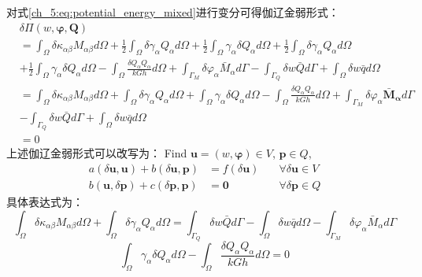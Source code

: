 对式\eqref{ch_5:eq:potential_energy_mixed}进行变分可得伽辽金弱形式：
\begin{equation} 
    \begin{split}
    &\delta\Pi(w,\boldsymbol\varphi,\boldsymbol{Q})\\
    &=\int_{\Omega}\delta\kappa_{\alpha \beta}M_{\alpha \beta}d\Omega+\frac{1}{2}\int_{\Omega}\delta\gamma_{\alpha}Q_{\alpha}d\Omega+\frac{1}{2}\int_{\Omega}\gamma_{\alpha}\delta{Q}_{\alpha}d\Omega+\frac{1}{2}\int_{\Omega}\delta\gamma_{\alpha}Q_{\alpha}d\Omega\\
    &+\frac{1}{2}\int_{\Omega}\gamma_{\alpha}\delta{Q}_{\alpha}d\Omega-\int_{\Omega}\frac{\delta{Q}_{\alpha}{Q}_{\alpha}}{kGh}d\Omega+\int_{\Gamma_{M}}\delta\varphi_{\alpha}{{\bar M}_{\alpha}}d\Gamma-\int_{\Gamma_{Q}}\delta{w}{\bar Q}d\Gamma+\int_{\Omega} \delta{w}\bar{q}d\Omega\\
    &=\int_{\Omega}\delta\kappa_{\alpha \beta}M_{\alpha \beta}d\Omega+\int_{\Omega}\delta\gamma_{\alpha}Q_{\alpha}d\Omega+\int_{\Omega}\gamma_{\alpha}\delta{Q}_{\alpha}d\Omega-\int_{\Omega}\frac{\delta{Q}_{\alpha}{Q}_{\alpha}}{kGh}d\Omega+\int_{\Gamma_{M}}\delta\varphi_{\alpha}{\boldsymbol{\bar M}_{\boldsymbol{\alpha}}}d\Gamma\\
    &-\int_{\Gamma_{Q}}\delta{w}{\bar Q}d\Gamma+\int_{\Omega} \delta{w}\bar{q}d\Omega\\
    &=0
    \end{split}
\end{equation}
上述伽辽金弱形式可以改写为：
Find $\boldsymbol u=(w,\boldsymbol{\varphi}) \in V$, $\boldsymbol p \in Q$,
\begin{equation}\label{ch_5:eq:weak_mix}
    \begin{aligned}
        a(\delta \boldsymbol u, \boldsymbol u) + b(\delta \boldsymbol u,\boldsymbol p) &= f(\delta \boldsymbol u) \quad &\forall \delta \boldsymbol u \in V \\
        b(\boldsymbol u, \delta \boldsymbol p) +  c(\delta \boldsymbol p,\boldsymbol p)&= \boldsymbol 0 \quad &\forall \delta \boldsymbol p \in Q
    \end{aligned}
\end{equation}
具体表达式为：
\begin{equation}\label{ch_5:eq:mindlin_weak1}
    \int_{\Omega}\delta\kappa_{\alpha \beta}M_{\alpha \beta}d\Omega+\int_{\Omega}\delta\gamma_{\alpha}Q_{\alpha}d\Omega=\int_{\Gamma_{Q}}\delta{w}{\bar Q}d\Gamma-\int_{\Omega} \delta{w}\bar{q}d\Omega-\int_{\Gamma_{M}}\delta\varphi_{\alpha}{{\bar M}_{\alpha}}d\Gamma
\end{equation}
\begin{equation}\label{ch_5:eq:mindlin_weak2}
    \int_{\Omega}\gamma_{\alpha}\delta{Q}_{\alpha}d\Omega-\int_{\Omega}\frac{\delta{Q}_{\alpha}{Q}_{\alpha}}{kGh}d\Omega=0
\end{equation}

